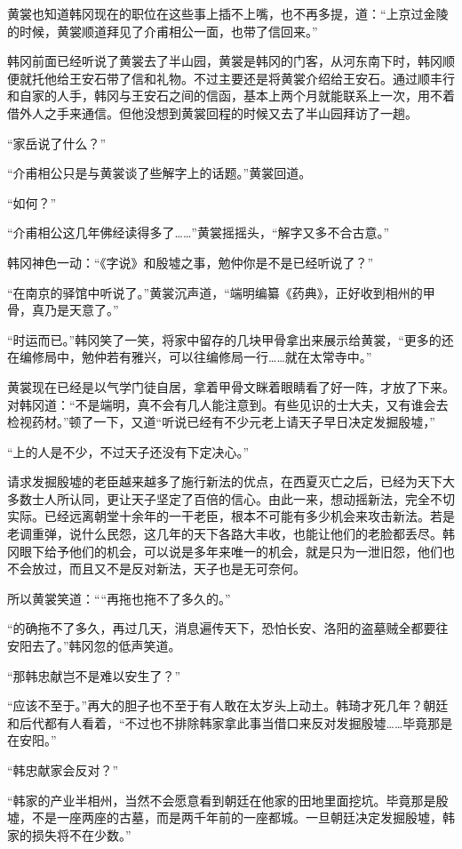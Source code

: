 黄裳也知道韩冈现在的职位在这些事上插不上嘴，也不再多提，道：“上京过金陵的时候，黄裳顺道拜见了介甫相公一面，也带了信回来。”

韩冈前面已经听说了黄裳去了半山园，黄裳是韩冈的门客，从河东南下时，韩冈顺便就托他给王安石带了信和礼物。不过主要还是将黄裳介绍给王安石。通过顺丰行和自家的人手，韩冈与王安石之间的信函，基本上两个月就能联系上一次，用不着借外人之手来通信。但他没想到黄裳回程的时候又去了半山园拜访了一趟。

“家岳说了什么？”

“介甫相公只是与黄裳谈了些解字上的话题。”黄裳回道。

“如何？”

“介甫相公这几年佛经读得多了……”黄裳摇摇头，“解字又多不合古意。”

韩冈神色一动：“《字说》和殷墟之事，勉仲你是不是已经听说了？”

“在南京的驿馆中听说了。”黄裳沉声道，“端明编纂《药典》，正好收到相州的甲骨，真乃是天意了。”

“时运而已。”韩冈笑了一笑，将家中留存的几块甲骨拿出来展示给黄裳，“更多的还在编修局中，勉仲若有雅兴，可以往编修局一行……就在太常寺中。”

黄裳现在已经是以气学门徒自居，拿着甲骨文眯着眼睛看了好一阵，才放了下来。对韩冈道：“不是端明，真不会有几人能注意到。有些见识的士大夫，又有谁会去检视药材。”顿了一下，又道“听说已经有不少元老上请天子早日决定发掘殷墟，”

“上的人是不少，不过天子还没有下定决心。”

请求发掘殷墟的老臣越来越多了施行新法的优点，在西夏灭亡之后，已经为天下大多数士人所认同，更让天子坚定了百倍的信心。由此一来，想动摇新法，完全不切实际。已经远离朝堂十余年的一干老臣，根本不可能有多少机会来攻击新法。若是老调重弹，说什么民怨，这几年的天下各路大丰收，也能让他们的老脸都丢尽。韩冈眼下给予他们的机会，可以说是多年来唯一的机会，就是只为一泄旧怨，他们也不会放过，而且又不是反对新法，天子也是无可奈何。

所以黄裳笑道：““再拖也拖不了多久的。”

“的确拖不了多久，再过几天，消息遍传天下，恐怕长安、洛阳的盗墓贼全都要往安阳去了。”韩冈忽的低声笑道。

“那韩忠献岂不是难以安生了？”

“应该不至于。”再大的胆子也不至于有人敢在太岁头上动土。韩琦才死几年？朝廷和后代都有人看着，“不过也不排除韩家拿此事当借口来反对发掘殷墟……毕竟那是在安阳。”

“韩忠献家会反对？”

“韩家的产业半相州，当然不会愿意看到朝廷在他家的田地里面挖坑。毕竟那是殷墟，不是一座两座的古墓，而是两千年前的一座都城。一旦朝廷决定发掘殷墟，韩家的损失将不在少数。”


